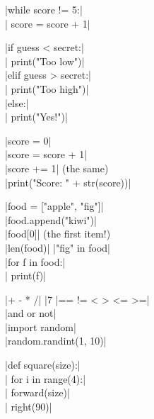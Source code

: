 \begin{tcbraster}
\begin{tcolorbox}[colback=white, colframe=control, colbacktitle=control!40, title=\textbf{Loops}]
\py|while score != 5:|\\
\py|    score = score + 1|
\end{tcolorbox}
\begin{tcolorbox}[colback=white, colframe=control, colbacktitle=control!40, title=\textbf{If}]
\py|if guess < secret:|\\
\py|    print("Too low")|\\
\py|elif guess > secret:|\\
\py|    print("Too high")|\\
\py|else:|\\
\py|    print("Yes!")|
\end{tcolorbox}
\begin{tcolorbox}[colback=white, colframe=variables, colbacktitle=variables!40, title=\textbf{Variables}]
\py|score = 0|\\
\py|score = score + 1|\\
\py|score += 1| {\color{muted}(the same)}\\
\py|print("Score: " + str(score))|
\end{tcolorbox}
\begin{tcolorbox}[colback=white, colframe=lists, colbacktitle=lists!40, title=\textbf{Lists}]
\py|food = ["apple", "fig"]|\\
\py|food.append("kiwi")|\\
\py|food[0]| {\color{muted}(the first item!)}\\
\py|len(food)| \quad \py|"fig" in food|\\
\py|for f in food:|\\
\py|    print(f)|
\end{tcolorbox}
\begin{tcolorbox}[colback=white, colframe=operators, colbacktitle=operators!40, title=\textbf{Operators}]
\py|+  -  *  /| \quad \py|7 %
\py|==  !=  <  >  <=  >=|\\
\py|and  or  not|\\
\py|import random|\\
\py|random.randint(1, 10)|
\end{tcolorbox}
\begin{tcolorbox}[colback=white, colframe=myblocks, colbacktitle=myblocks!40, title=\textbf{My own block}]
\py|def square(size):|\\
\py|    for i in range(4):|\\
\py|        forward(size)|\\
\py|        right(90)|\\

\end{tcolorbox}
\end{tcbraster}
